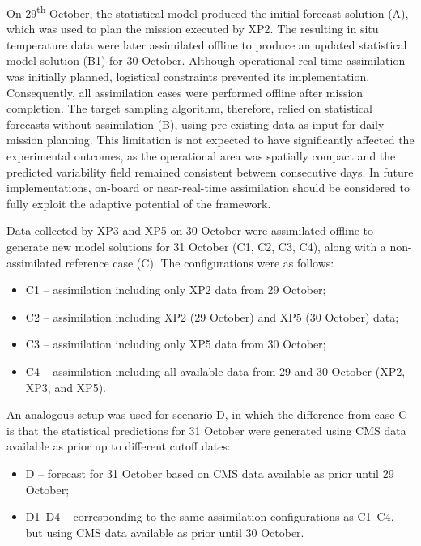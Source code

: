 On 29\textsuperscript{th} October, the statistical model produced the
initial forecast solution (A), which was used to plan the mission
executed by XP2. The resulting in situ temperature data were later
assimilated offline to produce an updated statistical model solution
(B1) for 30 October. Although operational real-time assimilation was
initially planned, logistical constraints prevented its
implementation. Consequently, all assimilation cases were performed
offline after mission completion. The target sampling algorithm,
therefore, relied on statistical forecasts without assimilation (B),
using pre-existing data as input for daily mission planning. This
limitation is not expected to have significantly affected the
experimental outcomes, as the operational area was spatially compact
and the predicted variability field remained consistent between
consecutive days. In future implementations, on-board or
near-real-time assimilation should be considered to fully exploit the
adaptive potential of the framework.

Data collected by XP3 and XP5 on 30 October were assimilated offline
to generate new model solutions for 31 October (C1, C2, C3, C4), along
with a non-assimilated reference case (C). The configurations were as
follows:

\begin{itemize}
    \item C1 – assimilation including only XP2 data from 29 October;
    \item C2 – assimilation including XP2 (29 October) and XP5 (30 October) data;
    \item C3 – assimilation including only XP5 data from 30 October;
    \item C4 – assimilation including all available data from 29 and 30 October (XP2, XP3, and XP5).
\end{itemize}

An analogous setup was used for scenario D, in which the difference
from case C is that the statistical predictions for 31 October were
generated using CMS data available as prior up to different cutoff dates:

\begin{itemize}
    \item D – forecast for 31 October based on CMS data available as prior until 29 October;
    \item D1–D4 – corresponding to the same assimilation
      configurations as C1–C4, but using CMS data available as prior until 30
      October.
\end{itemize}

